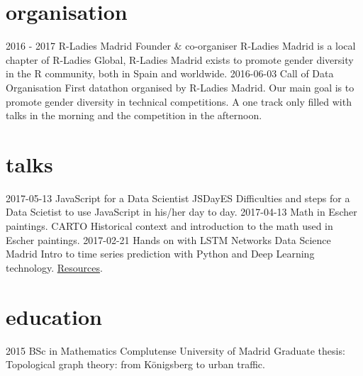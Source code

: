 \documentclass[]{friggeri-cv}
\begin{document}
\section{organisation}

\begin{entrylist}
    \entry
    {2016 - 2017}
    {R-Ladies Madrid}
    {Founder & co-organiser}
    {R-Ladies Madrid is a local chapter of R-Ladies Global, R-Ladies Madrid exists to promote gender diversity in the R community, both in Spain and worldwide.}
  \entry
    {2016-06-03}
    {Call of Data}
    {Organisation}
    {First datathon organised by R-Ladies Madrid. Our main goal is to promote gender diversity in technical competitions. A one track only filled with talks in the morning and the competition in the afternoon.}
\end{entrylist}

\section{talks}

\begin{entrylist}
  \entry
    {2017-05-13}
    {JavaScript for a Data Scientist}
    {JSDayES}
    {Difficulties and steps for a Data Scietist to use JavaScript in his/her day to day.}
  \entry
    {2017-04-13}
    {Math in Escher paintings.}
    {CARTO}
    {Historical context and introduction to the math used in Escher paintings.}
  \entry
    {2017-02-21}
    {Hands on with LSTM Networks}
    {Data Science Madrid}
    {Intro to time series prediction with Python and Deep Learning technology. \href{https://github.com/chucheria/20170221_DSM-Workbook}{Resources}.}
\end{entrylist}

\section{education}

\begin{entrylist}
  \entry
    {2015}
    {BSc in Mathematics}
    {Complutense University of Madrid}
    {Graduate thesis: Topological graph theory: from Königsberg to urban traffic.}
\end{entrylist}



\end{document}
